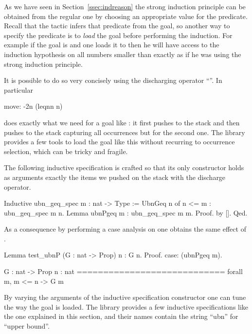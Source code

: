 As we have seen in Section~\ref{ssec:indreason} the strong induction principle
can be obtained from the regular one by choosing an appropriate value for
the predicate. Recall that the  tactic infers that predicate from the
goal, so another way to specify the predicate is to \emph{load} the goal
before performing the induction.
For example if the goal is  and one loads it to
 then he will have access to the
induction hypothesis on all numbers smaller than  exactly as
if he was using the strong induction principle.

It is possible to
do so very concisely using the discharging operator ``\C{:}''.
In particular
\begin{coq}{}{}
move: {-2}n (leqnn n)
\end{coq}{}{}
does exactly what we need
for a goal like : it first pushes to the stack 
and then pushes to the stack  capturing all occurrences but for
the second one.
The \mcbMC{} library provides a few tools to load the goal like this
without recurring to occurrence selection, which can be tricky and fragile.

The following inductive specification is crafted so that its only constructor
holds as arguments exactly the items we pushed on the stack with the discharge
operator.

\begin{coq}{}{}
Inductive ubn_geq_spec m : nat -> Type :=
  UbnGeq n of n <= m : ubn_geq_spec m n.
Lemma ubnPgeq m : ubn_geq_spec m m.
Proof. by []. Qed.
\end{coq}{}{}

As a consequence by performing a case analysis on  one
obtains the same effect of .

\begin{coq}{}{}
Lemma test_ubnP (G : nat -> Prop) n : G n.
Proof.
case: (ubnPgeq m).
\end{coq}{}{}
\begin{coqout}{}{}
G : nat -> Prop
n : nat
============================
forall m, m <= n -> G m
\end{coqout}{}{}

By varying the arguments of the inductive specification constructor one
can tune the way the goal is loaded. The \mcbMC{} library
provides a few inductive specifications like the one
explained in this section, and their names contain the string
``ubn'' for ``upper bound''.

